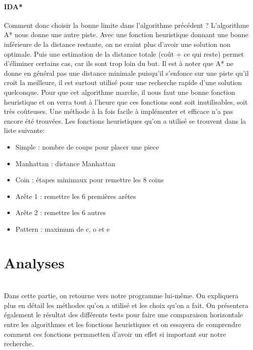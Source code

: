 \documentclass[fleqn,10pt,french]{SelfArx} %
\begin{document}
\paragraph{IDA*}
Comment donc choisir la bonne limite dans l’algorithme précédent ? L’algorithme A* nous donne une autre piste. Avec une fonction heuristique donnant une bonne inférieure de la distance restante, on ne craint plus d’avoir une solution non optimale. Puis une estimation de la distance totale (coût + ce qui reste) permet d’éliminer certains cas, car ils sont trop loin du but. Il est à noter que A* ne donne en général pas une distance minimale puisqu’il s’enfonce sur une piste qu’il croit la meilleure, il est surtout utilisé pour une recherche rapide d’une solution quelconque. Pour que cet algorithme marche, il nous faut une bonne fonction heuristique et on verra tout à l’heure que ces fonctions sont soit inutilisables, soit très coûteuses. Une méthode à la fois facile à implémenter et efficace n’a pas encore été trouvées. Les fonctions heuristiques qu’on a utilisé se trouvent dans la liste suivante: 

\begin{itemize}[noitemsep] %
\item Simple : nombre de coups pour placer une piece
\item Manhattan : distance Manhattan
\item Coin : étapes minimaux pour remettre les 8 coins
\item Arête 1 : remettre les 6 premières arêtes
\item Arête 2 : remettre les 6 autres
\item Pattern : maximum de c, o et e
\end{itemize}


\section{Analyses}

~\\\indent
Dans cette partie, on retourne vers notre programme lui-même. On expliquera plus en détail les méthodes qu’on a utilisé et les choix qu’on a fait. On présentera également le résultat des différents tests pour faire une comparaison horizontale entre les algorithmes et les fonctions heuristiques et on essayera de comprendre comment ces fonctions permmetten d’avoir un effet si important sur notre recherche.
\end{document}
